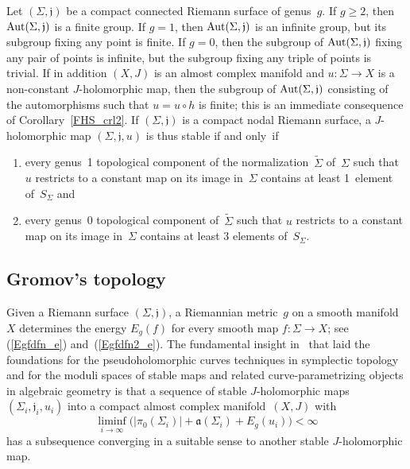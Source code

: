 \documentclass[11pt]{article}
\numberwithin{equation}{section}
\theoremstyle{definition}
\def\BE#1{\begin{equation}\label{#1}}
\def\EE{\end{equation}}
\def\eref#1{(\ref{#1})}
\def\wt#1{\widetilde{#1}}
\def\sf#1{\textsf{#1}}
\def\lra{\longrightarrow}
\def\fa{\mathfrak a}
\def\fj{\mathfrak j}
\def\Si{\Sigma}
\def\i{\infty}
\def\Aut{\textnormal{Aut}}
\begin{document}
\noindent
Let $(\Si,\fj)$ be a compact connected Riemann surface of genus~$g$.
If $g\!\ge\!2$, then $\Aut(\Si,\fj)$ is a finite group.
If  $g\!=\!1$, then $\Aut(\Si,\fj)$ is an infinite group, but its subgroup
fixing any point is finite.
If  $g\!=\!0$, then the subgroup of  $\Aut(\Si,\fj)$ fixing any pair of points
is infinite, but the subgroup fixing any triple of points is trivial.
If in addition $(X,J)$ is an almost complex manifold
and $u\!:\Si\!\lra\!X$ is a non-constant $J$-holomorphic map, 
then the subgroup of $\Aut(\Si,\fj)$ consisting of the automorphisms
such that $u\!=\!u\!\circ\!h$ is finite;
this is an immediate consequence of Corollary~\ref{FHS_crl2}.
If $(\Si,\fj)$ is a compact nodal Riemann surface,
a $J$-holomorphic map $(\Si,\fj,u)$ is thus stable if and only~if
\begin{enumerate}[label=$\bullet$,leftmargin=*]

\item every  genus~1 topological component of the normalization~$\wt\Si$ 
of~$\Si$ such that $u$ restricts to a constant map on its image in~$\Si$
contains at least 1~element of~$S_{\Si}$ and

\item every genus~0 topological component of~$\wt\Si$ 
such that $u$ restricts to a constant map on its image in~$\Si$
contains at least 3 elements of~$S_{\Si}$.

\end{enumerate}


\subsection{Gromov's topology}
\label{GrTopol_subs}

\noindent
Given a Riemann surface $(\Si,\fj)$,
a Riemannian metric~$g$ on a smooth manifold~$X$ determines 
the \sf{energy} $E_g(f)$ for every smooth map $f\!:\Si\!\lra\!X$;
see \eref{Egfdfn_e} and~\eref{Egfdfn2_e}.
The fundamental insight in~\cite{Gr} that laid the foundations
for the pseudoholomorphic curves techniques in symplectic topology
and for the moduli spaces of stable maps and related curve-parametrizing objects
in algebraic geometry
is that a sequence of stable $J$-holomorphic maps $(\Si_i,\fj_i,u_i)$ 
into a compact almost complex manifold~$(X,J)$ with 
\BE{Ebndcond_e}
\liminf_{i\lra\i}\!\Big(\big|\pi_0(\Si_i)\big|\!+\!\fa(\Si_i)\!+\!E_g(u_i)\!\Big)<\i\EE
has a subsequence converging in a suitable sense to another 
stable $J$-holomorphic map.\\
\end{document}
